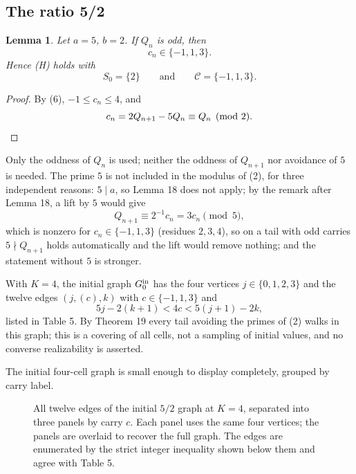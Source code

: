 \documentclass[11pt,reqno]{amsart}
\newtheorem{lemma}[theorem]{Lemma}
\theoremstyle{definition}
\theoremstyle{remark}
\begin{document}
\subsection{The ratio 5/2}\label{sec:5.3}

\begin{samepage}
\begin{lemma}\leavevmode\label{thm:24}
Let \(a=5\), \(b=2\). If \(Q_n\) is odd, then
\[
c_n\in\{-1,1,3\}.
\]
Hence (H) holds with
\[
S_0=\{2\}\qquad \text{and}\qquad \mathcal C=\{-1,1,3\}.
\]
\label{thm-end:24}
\end{lemma}
\end{samepage}

\begin{proof}\leavevmode\label{proof:24}
By (6), \(-1\le c_n\le4\), and
\[
c_n=2Q_{n+1}-5Q_n\equiv Q_n\pmod2.\qedhere
\]
\end{proof}

Only the oddness of \(Q_n\) is used; neither the oddness of \(Q_{n+1}\)
nor avoidance of \(5\) is needed. The prime \(5\) is not included in the
modulus of (2), for three independent reasons: \(5\mid a\), so
Lemma 18 does not apply; by the remark after Lemma 18, a lift by \(5\)
would give
\[
Q_{n+1}\equiv2^{-1}c_n=3c_n\pmod5,
\]
which is nonzero for
\(c_n\in\{-1,1,3\}\) (residues \(2,3,4\)), so on a tail with odd carries
\(5\nmid Q_{n+1}\) holds automatically and the lift would remove
nothing; and the statement without \(5\) is stronger.

With \(K=4\), the initial graph \(G_0^{\rm in}\) has the four vertices
\(j\in\{0,1,2,3\}\) and the twelve edges \((j,(c),k)\) with
\(c\in\{-1,1,3\}\) and
\[
5j-2(k+1)<4c<5(j+1)-2k,
\]
listed in Table 5.
By Theorem 19 every tail avoiding the primes of (2) walks in this graph;
this is a covering of all cells, not a sampling of initial values, and
no converse realizability is asserted.

The initial four-cell graph is small enough to display completely, grouped by carry label.

\begin{figure}[htbp]
\centering

\caption{All twelve edges of the initial \(5/2\) graph at \(K=4\), separated into three panels by carry \(c\). Each panel uses the same four vertices; the panels are overlaid to recover the full graph. The edges are enumerated by the strict integer inequality shown below them and agree with Table 5.}
\label{fig:initial-graph}
\end{figure}
\end{document}
